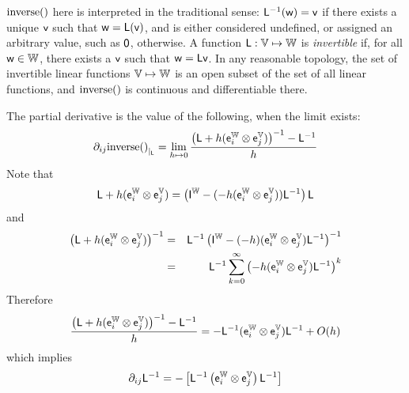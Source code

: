 \label{sec:Inverse}

$\mathrm{inverse}()$ here is interpreted in the traditional sense:
$\mathsf{L}^{-1}(\mathsf{w}) = \mathsf{v}$ if there exists a unique $\mathsf{v}$ such that $\mathsf{w} = \mathsf{L}(\mathsf{v})$,
and is either considered undefined, or assigned an arbitrary
value, such as ${\mathsf 0}$, otherwise.
A function $\mathsf{L} : \mathbb{V} \mapsto \mathbb{W}$ is \textit{invertible}
if, for all $\mathsf{w} \in \mathbb{W}$, there exists a $\mathsf{v}$ such that
$\mathsf{w} = \mathsf{L} \mathsf{v}$.
In any reasonable topology,
the set of invertible linear functions $\mathbb{V} \mapsto \mathbb{W}$
is an open subset of the set of all linear functions,
and $\mathrm{inverse}()$ is continuous and differentiable there.

The partial derivative is the value of the following, when the limit exists:
\begin{displaymath}
{\partial}_{ij}{\mathrm{inverse}()}_{\mid_{\mathsf{L}}}
 =
\lim_{ h \mapsto 0}
\frac{ \left( \mathsf{L} + h (\mathsf{e}_i^{\mathbb{W}} \otimes \mathsf{e}_j^{\mathbb{V}}) \right)^{-1} - \mathsf{L}^{-1} }{h}
\end{displaymath}
Note that
\begin{displaymath}
\mathsf{L} + h (\mathsf{e}_i^{\mathbb{W}} \otimes \mathsf{e}_j^{\mathbb{V}})
 =
\left( \mathsf{I}^{\mathbb{W}} - ( -h ( \mathsf{e}_i^{\mathbb{W}} \otimes \mathsf{e}_j^{\mathbb{V}} )) \mathsf{L}^{-1} \right) \mathsf{L}
\end{displaymath}
and
\begin{eqnarray*}
\left( \mathsf{L} + h (\mathsf{e}_i^{\mathbb{W}} \otimes \mathsf{e}_j^{\mathbb{V}}) \right)^{-1}
& = &
\mathsf{L}^{-1} \left( \mathsf{I}^{\mathbb{W}} - ( -h )( \mathsf{e}_i^{\mathbb{W}} \otimes \mathsf{e}_j^{\mathbb{V}} ) \mathsf{L}^{-1} \right)^{-1}
\\
& = &
\mathsf{L}^{-1} \sum_{k=0}^{\infty} \left( -h ( \mathsf{e}_i^{\mathbb{W}} \otimes \mathsf{e}_j^{\mathbb{V}} ) \mathsf{L}^{-1} \right)^{k}
\nonumber
\end{eqnarray*}
Therefore
\begin{displaymath}
\frac{ \left( \mathsf{L} + h (\mathsf{e}_i^{\mathbb{W}} \otimes \mathsf{e}_j^{\mathbb{V}}) \right)^{-1} - \mathsf{L}^{-1} }{h}
 =
- \mathsf{L}^{-1} ( \mathsf{e}_i^{\mathbb{W}} \otimes \mathsf{e}_j^{\mathbb{V}} )  \mathsf{L}^{-1} + O(h)
\end{displaymath}
which implies
\begin{equation}
{\partial}_{ij}{\mathsf{L}^{-1}}
 =
- \left[
\mathsf{L}^{-1}
\left( \mathsf{e}_i^{\mathbb{W}} \otimes \mathsf{e}_j^{\mathbb{V}} \right)
\mathsf{L}^{-1}
\right]
\end{equation}


\label{sec:Pseudo-inverse}

